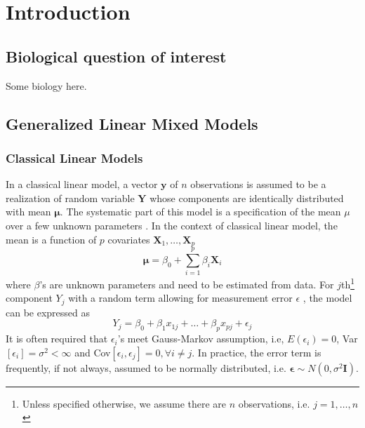 	
\section{Introduction}\label{sec:intro}
	
\subsection{Biological question of interest}\label{subsec:biol}
	Some biology here.
	
	
\subsection{Generalized Linear Mixed Models}\label{subsec:glmm}
	\subsubsection{Classical Linear Models}
	In a classical linear model, a vector $\bm y$ of $n$ observations is assumed to be a realization of random variable $\bm Y$ whose components are identically distributed with mean $\bm \mu$. The systematic part of this model is a specification of the mean $\mu$ over a few unknown parameters \citep{mccullagh1989generalized}. In the context of classical linear model, the mean is a function of $p$ covariates $\bm X_1, \ldots, \bm X_p$
	\begin{equation}\label{q1}
	\bm \mu =\beta_0 + \sum_{i=1}^p\beta_i \bm X_i
	\end{equation}	
	where $\beta$'s are unknown parameters and need to be estimated from data.  For $j$th\footnote{Unless specified otherwise, we assume there are $n$ observations, i.e. $j=1, \ldots ,n$} component $ Y_j$ with a random term allowing for measurement error $\epsilon$ , the model can be expressed as 
	\begin{equation}\label{q2}
	Y_j= \beta_0 + \beta_1x_{1j} + \ldots + \beta_p x_{pj} + \epsilon_j
	\end{equation}
	It is often required that $\epsilon_i$'s meet Gauss-Markov assumption, i.e, $E(\epsilon_i)=0$, Var$[\epsilon_i]=
	\sigma^2<\infty$ and Cov$[\epsilon_i, \epsilon_j]=0, \forall i \neq j$. In practice, the error term is frequently, if not always, assumed to be normally distributed, i.e.  $\bm \epsilon \sim N(0, \sigma^2 \bm I)$. \\
	
